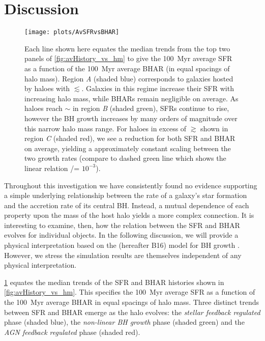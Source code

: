 \section{Discussion}
\label{sect:discussion}

\begin{figure}
\texttt{[image: plots/AvSFRvsBHAR]}

\caption{Each line shown here equates the median trends from the top two panels
of \cref{fig:avHistory_vs_hm} to give the 100~Myr average SFR as a function of
the 100~Myr average BHAR (in equal spacings of halo mass). Region \emph{A}
(shaded blue) corresponds to galaxies hosted by haloes with 
$\lesssim$. Galaxies in this regime increase their SFR with increasing
halo mass, while BHARs remain negligible on average. As haloes reach
$\sim$ in region \emph{B} (shaded green), SFRs continue to rise,
however the BH growth increases by many orders of magnitude over this narrow
halo mass range. For haloes in excess of $\gtrsim$  shown in region
\emph{C} (shaded red), we see a reduction for both SFR and BHAR on average,
yielding a approximately constant scaling between the two growth rates (compare
to dashed green line which shows the linear relation \BHAR/\SFR = $10^{-3}$).}

\label{fig:sfr_vs_bhar_av} \end{figure}

Throughout this investigation we have consistently found no evidence supporting
a simple underlying relationship between the rate of a galaxy's star formation
and the accretion rate of its central BH. Instead, a mutual dependence of each
property upon the mass of the host halo yields a more complex connection. It is
interesting to examine, then, how the relation between the SFR and BHAR evolves
for individual objects. In the following discussion, we will provide a physical
interpretation based on the \citet{Bower2017} (hereafter B16) model for BH
growth \citep[for a similar interpretation on the importance of SN feedback to
BH growth see][]{Dubois2015,Habouzit2016}.  However, we stress the simulation
results are themselves independent of any physical interpretation.  

\cref{fig:sfr_vs_bhar_av} equates the median trends of the SFR and BHAR
histories shown in \cref{fig:avHistory_vs_hm}. This specifies the 100~Myr
average SFR as a function of the 100~Myr average BHAR in equal spacings of halo
mass.  Three distinct trends between SFR and BHAR emerge as the halo evolves:
the \emph{stellar feedback regulated} phase (shaded blue), the \emph{non-linear
BH growth} phase (shaded green) and the \emph{AGN feedback regulated} phase
(shaded red).

